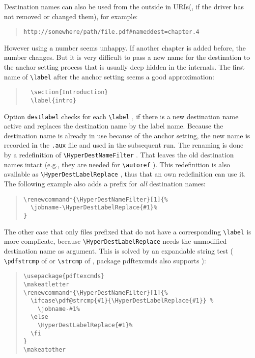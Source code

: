 \documentclass{article}
\newcommand*{\cs}[1]{%
  \texttt{\textbackslash #1}%
}
\newcommand*{\xpackage}[1]{\textsf{#1}}
\begin{document}
Destination names can also be used from the outside in URIs(, if the
driver has not removed or changed them), for example:
\begin{quote}
\begin{verbatim}
http://somewhere/path/file.pdf#nameddest=chapter.4
\end{verbatim}
\end{quote}
However using a number seems unhappy. If another chapter is added
before, the number changes. But it is very difficult to pass
a new name for the destination to the anchor setting process that
is usually deep hidden in the internals. The first name of
\cs{label} after the anchor setting seems a good approximation:
\begin{quote}
\begin{verbatim}
  \section{Introduction}
  \label{intro}
\end{verbatim}
\end{quote}
Option \texttt{destlabel} checks for each \cs{label}, if there is
a new destination name active and replaces the destination
name by the label name. Because the destination name is already in use
because of the anchor setting, the new name is recorded in the \texttt{.aux}
file and used in the subsequent  run. The renaming is done by
a redefinition of \cs{HyperDestNameFilter}. That leaves the old
destination names intact (e.g., they are needed for \cs{autoref}).
This redefinition is also available as \cs{HyperDestLabelReplace},
thus that an own redefinition can use it.
The following example also adds a prefix for \emph{all} destination names:
\begin{quote}
\begin{verbatim}
\renewcommand*{\HyperDestNameFilter}[1]{%
  \jobname-\HyperDestLabelReplace{#1}%
}
\end{verbatim}
\end{quote}
The other case that only files prefixed that do not have a corresponding
\cs{label} is more complicate, because \cs{HyperDestLabelReplace} needs
the unmodified destination name as argument. This is solved by an
expandable string test (\cs{pdfstrcmp} of 
or \cs{strcmp} of , package \xpackage{pdftexcmds} also supports
):
\begin{quote}
\begin{verbatim}
\usepackage{pdftexcmds}
\makeatletter
\renewcommand*{\HyperDestNameFilter}[1]{%
  \ifcase\pdf@strcmp{#1}{\HyperDestLabelReplace{#1}} %
    \jobname-#1%
  \else
    \HyperDestLabelReplace{#1}%
  \fi
}
\makeatother
\end{verbatim}
\end{quote}
\end{document}

